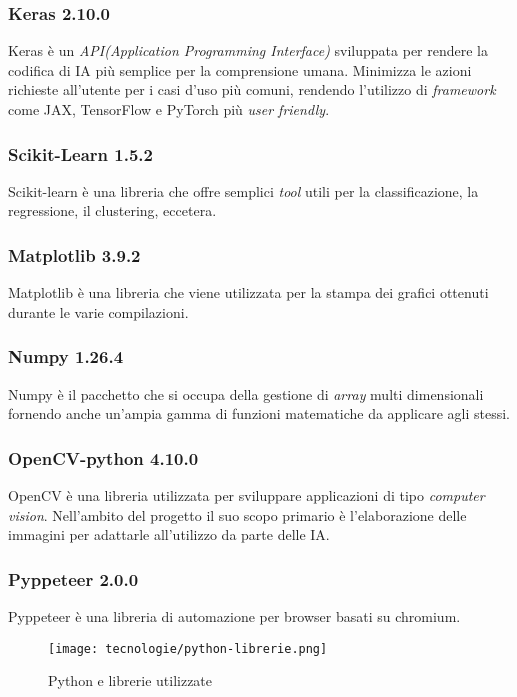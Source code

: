 \subsubsection{Keras 2.10.0}
Keras è un \emph{\gls{API}\glsfirstoccur (Application Programming Interface)} sviluppata per rendere la codifica di IA più semplice per la comprensione umana. 
Minimizza le azioni richieste all'utente per i casi d'uso più comuni, rendendo l'utilizzo di \emph{\gls{framework}} come JAX, TensorFlow e PyTorch più \emph{user friendly}.

\subsubsection{Scikit-Learn 1.5.2}
Scikit-learn è una libreria che offre semplici \emph{tool} utili per la classificazione, la regressione, il clustering, eccetera.

\subsubsection{Matplotlib 3.9.2}
Matplotlib è una libreria che viene utilizzata per la stampa dei grafici ottenuti durante le varie compilazioni. 

\subsubsection{Numpy 1.26.4}
Numpy è il pacchetto che si occupa della gestione di \emph{array} multi dimensionali fornendo anche un'ampia gamma di funzioni matematiche da applicare agli stessi.

\subsubsection{OpenCV-python 4.10.0}
OpenCV è una libreria utilizzata per sviluppare applicazioni di tipo \emph{\gls{computer vision}}\glsfirstoccur. Nell'ambito del progetto il suo scopo primario è l'elaborazione delle immagini per adattarle all'utilizzo da parte delle IA. 

\subsubsection{Pyppeteer 2.0.0}
Pyppeteer è una libreria di automazione per browser basati su chromium.

\begin{figure}[!h] 
  \centering 
  \texttt{[image: tecnologie/python-librerie.png]} 
  \caption{Python e librerie utilizzate}
  \label{fig:logo-python}
\end{figure}

